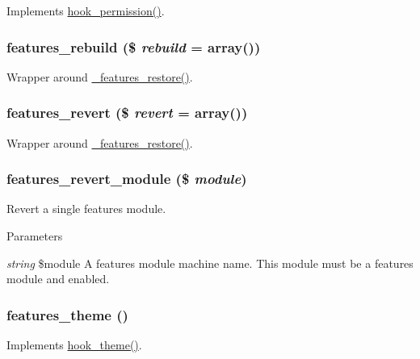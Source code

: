 \label{features_8module_a8798acbb3fe11426ba45f33a83e055b6}
Implements \hyperlink{group__hooks_ga2b22b45f4925f2478412477bae329713}{hook\_\-permission()}. \hypertarget{features_8module_a059a6b5b807abf2d3004beae665cd41c}{
\subsubsection[{features\_\-rebuild}]{\setlength{\rightskip}{0pt plus 5cm}features\_\-rebuild (\$ {\em rebuild} = {\ttfamily array()})}}
\label{features_8module_a059a6b5b807abf2d3004beae665cd41c}
Wrapper around \hyperlink{features_8module_a0298400d481d56cee72177e00c1777cd}{\_\-features\_\-restore()}. \hypertarget{features_8module_a2387a306760f9e3f11596672883ad181}{
\subsubsection[{features\_\-revert}]{\setlength{\rightskip}{0pt plus 5cm}features\_\-revert (\$ {\em revert} = {\ttfamily array()})}}
\label{features_8module_a2387a306760f9e3f11596672883ad181}
Wrapper around \hyperlink{features_8module_a0298400d481d56cee72177e00c1777cd}{\_\-features\_\-restore()}. \hypertarget{features_8module_a7d98a16c1662382dae41746df94b8e86}{
\subsubsection[{features\_\-revert\_\-module}]{\setlength{\rightskip}{0pt plus 5cm}features\_\-revert\_\-module (\$ {\em module})}}
\label{features_8module_a7d98a16c1662382dae41746df94b8e86}
Revert a single features module.


\begin{DoxyParams}{Parameters}
\item[{\em string}]\$module A features module machine name. This module must be a features module and enabled. \end{DoxyParams}
\hypertarget{features_8module_aa4bc5c89bc3ae19889dc444bf408608d}{
\subsubsection[{features\_\-theme}]{\setlength{\rightskip}{0pt plus 5cm}features\_\-theme ()}}
\label{features_8module_aa4bc5c89bc3ae19889dc444bf408608d}
Implements \hyperlink{group__hooks_ga013ccb45c7aaab1c16cf9691428c910d}{hook\_\-theme()}. 